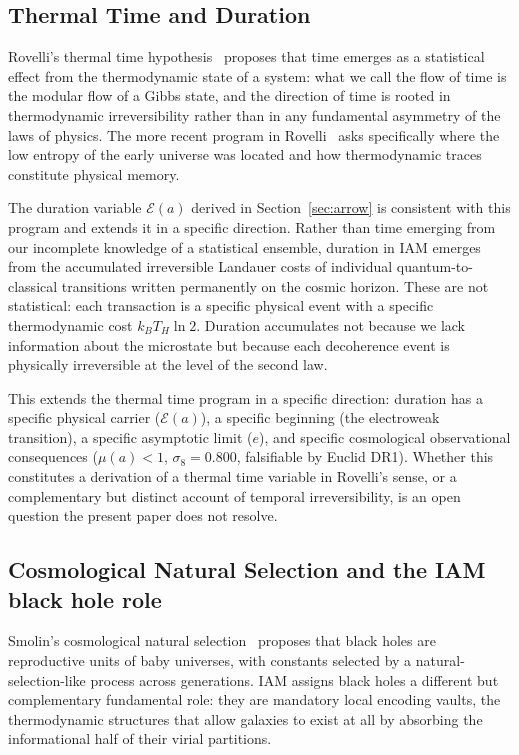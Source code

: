 \documentclass[12pt,a4paper]{article}
\begin{document}
\subsection{Thermal Time and Duration}

Rovelli's thermal time hypothesis~\citep{Connes1994,Rovelli1993} proposes
that time emerges as a statistical effect from the thermodynamic state of
a system: what we call the flow of time is the modular flow of a
Gibbs state, and the direction of time is rooted in thermodynamic
irreversibility rather than in any fundamental asymmetry of the laws of
physics. The more recent program in Rovelli~\citep{Rovelli2019,Rovelli2020}
asks specifically where the low entropy of the early universe was located
and how thermodynamic traces constitute physical memory.

The duration variable $\mathcal{E}(a)$ derived in Section~\ref{sec:arrow}
is consistent with this program and extends it in a specific direction.
Rather than time emerging from our incomplete knowledge of a statistical
ensemble, duration in IAM emerges from the accumulated irreversible
Landauer costs of individual quantum-to-classical transitions written
permanently on the cosmic horizon. These are not statistical: each
transaction is a specific physical event with a specific thermodynamic
cost $k_B T_H \ln 2$. Duration accumulates not because we lack information
about the microstate but because each decoherence event is physically
irreversible at the level of the second law.

This extends the thermal time program in a specific direction: duration
has a specific physical carrier ($\mathcal{E}(a)$), a specific beginning
(the electroweak transition), a specific asymptotic limit ($e$), and
specific cosmological observational consequences ($\mu(a) < 1$,
$\sigma_8 = 0.800$, falsifiable by Euclid DR1). Whether this constitutes a derivation of a thermal time
variable in Rovelli's sense, or a complementary but distinct account of
temporal irreversibility, is an open question the present paper does not
resolve.

\subsection{Cosmological Natural Selection and the IAM black hole role}

Smolin's cosmological natural selection~\citep{Smolin1992,Smolin1997}
proposes that black holes are reproductive units of baby universes,
with constants selected by a natural-selection-like process across
generations. IAM assigns black holes a different but complementary
fundamental role: they are mandatory local encoding vaults, the
thermodynamic structures that allow galaxies to exist at all by absorbing
the informational half of their virial partitions.
\end{document}
